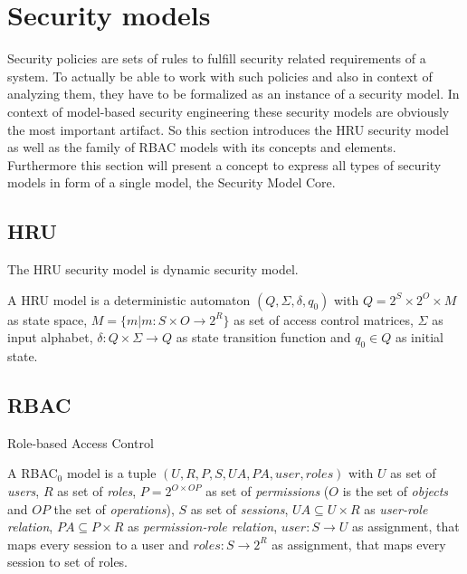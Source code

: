 \documentclass[twoside, openright, 12pt]{book}
\begin{document}
\section{Security models}
\label{security_models}
Security policies are sets of rules to fulfill security related requirements of a system.
To actually be able to work with such policies and also in context of analyzing them, they have to be formalized as an instance of a security model.
In context of model-based security engineering these security models are obviously the most important artifact.
So this section introduces the HRU security model as well as the family of RBAC models with its concepts and elements.
Furthermore this section will present a concept to express all types of security models in form of a single model, the Security Model Core.

\subsection{HRU}
\label{HRU}
The HRU security model \citep*{Harrison75a} is dynamic security model.

\begin{xdefinition}[HRU] 
A HRU model is a deterministic automaton
$(Q, \Sigma , \delta , q_{0})$ with 
$Q = 2^S \times 2^O \times M$ as state space, 
$M = \lbrace m|m:S \times O \rightarrow 2^R \rbrace$ as set of access control matrices, 
$\Sigma$ as input alphabet, 
$\delta : Q \times \Sigma \rightarrow Q$ as state transition function and 
$q_0 \in Q$ as initial state.
\end{xdefinition}

\subsection{RBAC}
\label{RBAC}
Role-based Access Control 

\begin{xdefinition}[RBAC] 
A RBAC$_0$ model is a tuple $(U, R, P, S, UA, PA, user, roles)$ with 
$U$ as set of \textit{users}, 
$R$ as set of \textit{roles}, 
$P = 2^{O \times OP}$ as set of \textit{permissions} 
($O$ is the set of \textit{objects} and 
$OP$ the set of \textit{operations}), 
$S$ as set of \textit{sessions}, 
$UA \subseteq U \times R$ as \textit{user-role relation}, 
$PA \subseteq P \times R$ as \textit{permission-role relation}, 
$user: S \rightarrow U$ as assignment, that maps every session to a user and
$roles: S \rightarrow 2^R$ as assignment, that maps every session to set of roles.
\end{xdefinition}
\end{document}
